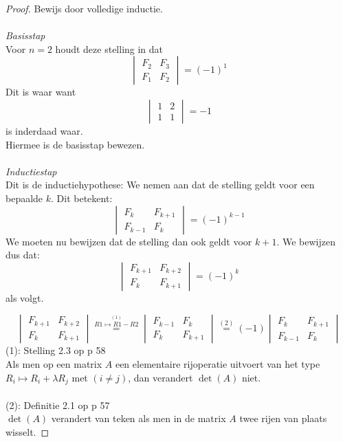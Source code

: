 \documentclass[lineaire_algebra_oplossingen.tex]{subfiles}
\begin{document}
\begin{proof}
Bewijs door volledige inductie.\\\\
\emph{Basisstap}\\
Voor $n=2$ houdt deze stelling in dat
\[
\begin{vmatrix}
F_{2}   & F_{3}\\
F_{1} & F_{2}
\end{vmatrix}
=
(-1)^{1}
\]
Dit is waar want
\[
\begin{vmatrix}
1 & 2\\
1 & 1
\end{vmatrix}
=
-1
\]
is inderdaad waar.\\
Hiermee is de basisstap bewezen.\\\\
\emph{Inductiestap}\\
Dit is de inductiehypothese: We nemen aan dat de stelling geldt voor een bepaalde $k$. Dit betekent:
\[
\begin{vmatrix}
F_{k}   & F_{k+1}\\
F_{k-1} & F_{k}
\end{vmatrix}
=
(-1)^{k-1}
\]
We moeten nu bewijzen dat de stelling dan ook geldt voor $k+1$.
We bewijzen dus dat:
\[
\begin{vmatrix}
F_{k+1}   & F_{k+2}\\
F_{k} & F_{k+1}
\end{vmatrix}
=
(-1)^{k}
\]
als volgt.

\[
\begin{vmatrix}
F_{k+1}   & F_{k+2}\\
F_{k} & F_{k+1}
\end{vmatrix}
\overset{\overset{(1)}{R1 \longmapsto R1-R2}}{=}
\begin{vmatrix}
F_{k-1}   & F_{k}\\
F_{k} & F_{k+1}
\end{vmatrix}
\overset{(2)}{=}
(-1)
\begin{vmatrix}
F_{k} & F_{k+1}\\
F_{k-1}   & F_{k}
\end{vmatrix}
\]
(1): Stelling 2.3 op p 58\\
Als men op een matrix $A$ een elementaire rijoperatie uitvoert van het type $R_{i} \longmapsto R_{i}+\lambda R_{j}$ met $(i \neq j)$, dan verandert $\det(A)$ niet.\\\\
(2): Definitie 2.1 op p 57\\
$\det(A)$ verandert van teken als men in de matrix $A$ twee rijen van plaats wisselt.


\end{proof}
\end{document}
